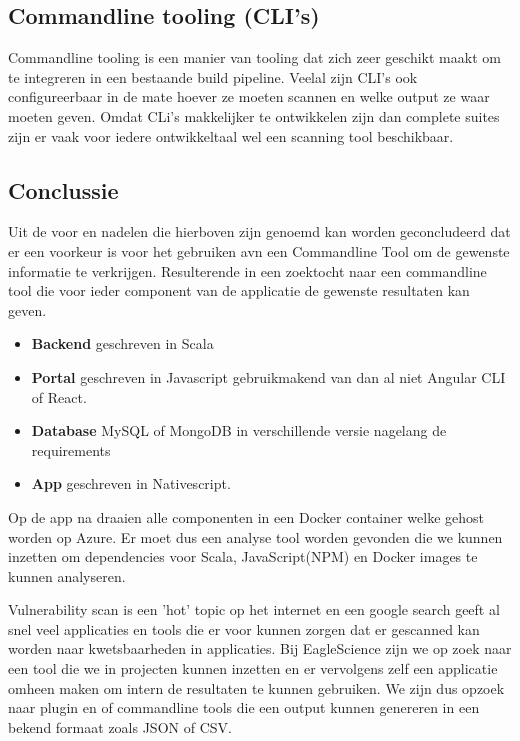 \subsection{Commandline tooling (CLI's)}
Commandline tooling is een manier van tooling dat zich zeer geschikt maakt om te integreren in een bestaande build pipeline. Veelal zijn CLI's ook configureerbaar in de mate hoever ze moeten scannen en welke output ze waar moeten geven. Omdat CLi's makkelijker te ontwikkelen zijn dan complete suites zijn er vaak voor iedere ontwikkeltaal wel een scanning tool beschikbaar.
\subsection{Conclussie}
Uit de voor en nadelen die hierboven zijn genoemd kan worden geconcludeerd dat er een voorkeur is voor het gebruiken avn een Commandline Tool om de gewenste informatie te verkrijgen. Resulterende in een zoektocht naar een commandline tool die voor ieder component van de applicatie de gewenste resultaten kan geven.





\begin{itemize}
    \item \textbf{Backend} geschreven in Scala
    \item \textbf{Portal} geschreven in Javascript gebruikmakend van dan al niet Angular CLI of React.
    \item \textbf{Database} MySQL of MongoDB in verschillende versie nagelang de requirements
    \item \textbf{App} geschreven in Nativescript.
\end{itemize}
Op de app na draaien alle componenten in een Docker container welke gehost worden op Azure. Er moet dus een analyse tool worden gevonden die we kunnen inzetten om dependencies voor Scala, JavaScript(NPM) en Docker images te kunnen analyseren.

Vulnerability scan is een 'hot' topic op het internet en een google search geeft al snel veel applicaties en tools die er voor kunnen zorgen dat er gescanned kan worden naar kwetsbaarheden in applicaties. Bij EagleScience zijn we op zoek naar een tool die we in projecten kunnen inzetten en er vervolgens zelf een applicatie omheen maken om intern de resultaten te kunnen gebruiken. We zijn dus opzoek naar plugin en of commandline tools die een output kunnen genereren in een bekend formaat zoals JSON of CSV.





